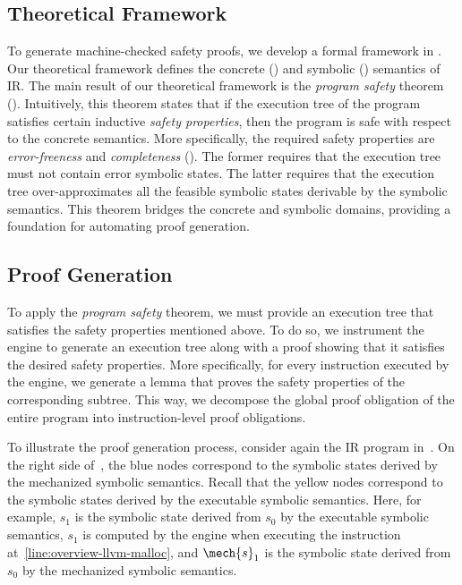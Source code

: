 \subsection{Theoretical Framework}

To generate machine-checked safety proofs, we develop a formal framework in \coq.
Our theoretical framework defines the concrete () and symbolic () semantics of \llvm IR.
The main result of our theoretical framework is the \emph{program safety} theorem ().
Intuitively, this theorem states that if the execution tree of the program satisfies certain inductive \emph{safety properties},
then the program is safe with respect to the concrete semantics.
More specifically, the required safety properties are \emph{error-freeness} and \emph{completeness} ().
The former requires that the execution tree must not contain error symbolic states.
The latter requires that the execution tree over-approximates all the feasible symbolic states derivable by the symbolic semantics.
This theorem bridges the concrete and symbolic domains,
providing a foundation for automating proof generation.

\subsection{Proof Generation}

To apply the \emph{program safety} theorem,
we must provide an execution tree that satisfies the safety properties mentioned above.
To do so, we instrument the \SE engine to generate an execution tree along with a proof showing that it satisfies the desired safety properties.
More specifically,
for every instruction executed by the \SE engine,
we generate a lemma that proves the safety properties of the corresponding subtree.
This way, we decompose the global proof obligation of the entire program into instruction-level proof obligations.

To illustrate the proof generation process, consider again the \llvm IR program in~.
On the right side of~,
the blue nodes correspond to the symbolic states derived by the mechanized symbolic semantics.
Recall that the yellow nodes correspond to the symbolic states derived by the executable symbolic semantics.
Here, for example,
$s_1$ is the symbolic state derived from $s_0$ by the executable symbolic semantics,
\ie $s_1$ is computed by the \SE engine when executing the instruction at~\cref{line:overview-llvm-malloc},
and $\mech{s}_1$ is the symbolic state derived from $s_0$ by the mechanized symbolic semantics.

